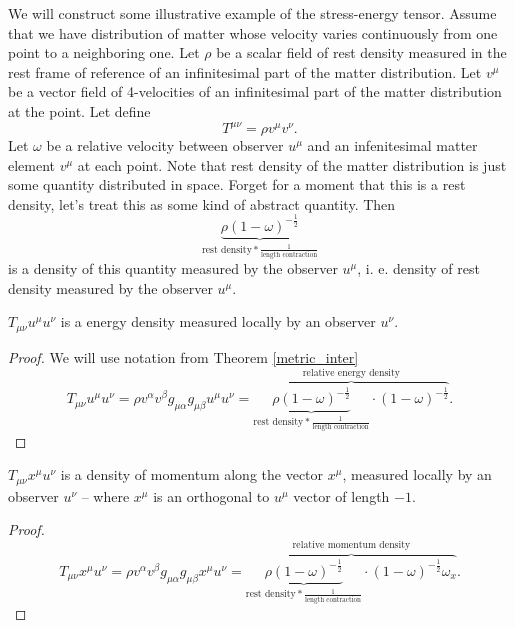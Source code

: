 \documentclass[main.tex]{subfiles}
\begin{document}
We will construct some illustrative example of the stress-energy tensor. Assume that we have distribution of matter whose velocity varies continuously from one point to a neighboring one. Let $\rho$ be a scalar field of rest density measured in the rest frame of reference of an infinitesimal part of the matter distribution. Let $v^\mu$ be a vector field of 4-velocities of an infinitesimal part of the matter distribution at the point. Let define
\begin{equation}
T^{\mu\nu} = \rho v^\mu v^\nu.
\end{equation}
Let $\omega$ be a relative velocity between observer $u^\mu$ and an infenitesimal matter element $v^\mu$ at each point.
Note that rest density of the matter distribution is just some quantity distributed in space. Forget for a moment that this is a rest density, let's treat this as some kind of abstract quantity. Then
\begin{equation}
\underbrace{\rho (1 - \omega)^{-\frac{1}{2}}}_{\text{rest density} * \frac{1}{\text{length contraction}}}
\end{equation}
is a density of this quantity measured by the observer $u^\mu$, i. e. density of rest density measured by the observer $u^\mu$.
\begin{fact}
$T_{\mu\nu} u^\mu u^\nu$ is a energy density measured locally by an observer $u^\nu$.
\end{fact}
\begin{proof}
We will use notation from Theorem \ref{metric_inter}
\begin{equation}
T_{\mu\nu} u^\mu u^\nu = \rho v^\alpha v^\beta g_{\mu\alpha}g_{\mu\beta} u^\mu u^\nu = \overbrace{\underbrace{\rho (1 - \omega)^{-\frac{1}{2}}}_{\text{rest density} * \frac{1}{\text{length contraction}}} \cdot(1 - \omega)^{-\frac{1}{2}}}^\text{relative energy density}.
\end{equation}
\end{proof}

\begin{fact}
$T_{\mu\nu} x^\mu u^\nu$ is a density of momentum along the vector $x^\mu$, measured locally by an observer $u^\nu$ -- where $x^\mu$ is an orthogonal to $u^\mu$ vector of length $-1$.  
\end{fact}
\begin{proof}

\begin{equation}
T_{\mu\nu} x^\mu u^\nu = \rho v^\alpha v^\beta g_{\mu\alpha}g_{\mu\beta} x^\mu u^\nu = \overbrace{\underbrace{\rho (1 - \omega)^{-\frac{1}{2}}}_{\text{rest density} * \frac{1}{\text{length contraction}}} \cdot (1 - \omega)^{-\frac{1}{2}}\omega_x}^\text{relative momentum density}.
\end{equation}
\end{proof}
\end{document}
